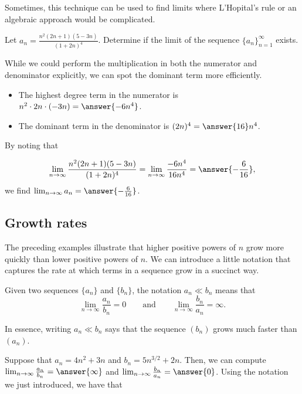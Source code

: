 \documentclass{ximera}
\begin{document}
Sometimes, this technique can be used to find limits where L'Hopital's rule or an algebraic approach would be complicated.

\begin{example}
Let $a_n = \frac{n^2(2n+1)(5-3n)}{(1+2n)^4}$.  Determine if the limit of the sequence $\{a_n\}_{n=1}^{\infty}$ exists.

\begin{explanation}
While we could perform the multiplication in both the numerator and denominator explicitly, we can spot the dominant term more efficiently.  
\begin{itemize}
\item The highest degree term in the numerator is $n^2 \cdot 2n \cdot (-3n) = \answer{-6n^4}$.
\item The dominant term in the denominator is $(2n)^4 = \answer{16}n^4$.  
\end{itemize}

By noting that 

\[ \lim_{n \to \infty} \frac{n^2(2n+1)(5-3n)}{(1+2n)^4} = \lim_{n \to \infty} \frac{-6n^4}{16n^4} = \answer{-\frac{6}{16}}, \]
we find $\lim_{n \to \infty} a_n = \answer{-\frac{6}{16}}$.
\end{explanation}
\end{example}
 
\subsection{Growth rates}
The preceding examples illustrate that higher positive powers of $n$ grow more quickly than lower positive powers of $n$.  We can introduce a little notation that captures the rate at which terms in a sequence grow in a succinct way.

\begin{definition}
  Given two sequences $\{a_n\}$ and $\{b_n\}$, the notation $a_n \ll
  b_n$ means that
  \[
  \lim_{n\to\infty} \frac{a_n}{b_n} =
  0\qquad\text{and}\qquad\lim_{n\to\infty} \frac{b_n}{a_n} =\infty.
  \]
\end{definition}

In essence, writing $a_n \ll b_n$ says that the sequence $(b_n)$ grows
much faster than $(a_n)$.

\begin{example}
Suppose that $a_n = 4n^2+3n$ and $b_n = 5n^{3/2}+2n$.  Then, we can compute $\lim_{n \to \infty} \frac{a_n}{b_n} = \answer{\infty}$ and $\lim_{n \to \infty} \frac{b_n}{a_n} = \answer{0}$.  Using the notation we just introduced, we have that 
\end{example}
\end{document}
